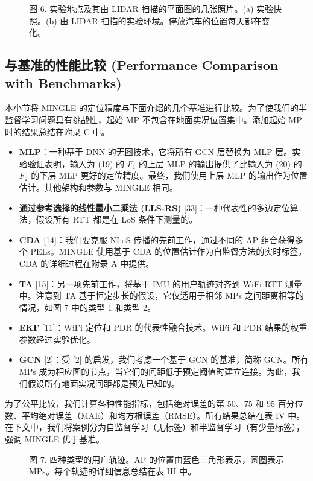 \documentclass[journal]{IEEEtran}
\begin{document}
\begin{figure}[htbp]
\centering
\caption{图 6. 实验地点及其由 LIDAR 扫描的平面图的几张照片。(a) 实验快照。(b) 由 LIDAR 扫描的实验环境。停放汽车的位置每天都在变化。}
\label{fig:6}
\end{figure}

\subsection{与基准的性能比较 (Performance Comparison with Benchmarks)}
本小节将 MINGLE 的定位精度与下面介绍的几个基准进行比较。为了使我们的半监督学习问题具有挑战性，起始 MP 不包含在地面实况位置集中。添加起始 MP 时的结果总结在附录 C 中。

\begin{itemize}
    \item \textbf{MLP}：一种基于 DNN 的无图技术，它将所有 GCN 层替换为 MLP 层。实验验证表明，输入为 (19) 的 $F_{1}$ 的上层 MLP 的输出提供了比输入为 (20) 的 $F_{2}$ 的下层 MLP 更好的定位精度。最终，我们使用上层 MLP 的输出作为位置估计。其他架构和参数与 MINGLE 相同。
    \item \textbf{通过参考选择的线性最小二乘法 (LLS-RS)} [33]：一种代表性的多边定位算法，假设所有 RTT 都是在 LoS 条件下测量的。
    \item \textbf{CDA} [14]：我们要克服 NLoS 传播的先前工作，通过不同的 AP 组合获得多个 PELs。MINGLE 使用基于 CDA 的位置估计作为自监督方法的实时标签。CDA 的详细过程在附录 A 中提供。
    \item \textbf{TA} [15]：另一项先前工作，将基于 IMU 的用户轨迹对齐到 WiFi RTT 测量中。注意到 TA 基于恒定步长的假设，它仅适用于相邻 MPs 之间距离相等的情况，如图 7 中的类型 1 和类型 2。
    \item \textbf{EKF} [11]：WiFi 定位和 PDR 的代表性融合技术。WiFi 和 PDR 结果的权重参数经过实验优化。
    \item \textbf{GCN} [2]：受 [2] 的启发，我们考虑一个基于 GCN 的基准，简称 GCN。所有 MPs 成为相应图的节点，当它们的间距低于预定阈值时建立连接。为此，我们假设所有地面实况间距都是预先已知的。
\end{itemize}

为了公平比较，我们计算各种性能指标，包括绝对误差的第 50、75 和 95 百分位数、平均绝对误差（MAE）和均方根误差（RMSE）。所有结果总结在表 IV 中。在下文中，我们将案例分为自监督学习（无标签）和半监督学习（有少量标签），强调 MINGLE 优于基准。

\begin{figure}[t]
\centering
\caption{图 7. 四种类型的用户轨迹。AP 的位置由蓝色三角形表示，圆圈表示 MPs。每个轨迹的详细信息总结在表 III 中。}
\label{fig:7}
\end{figure}
\end{document}
